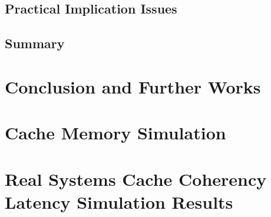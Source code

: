 \documentclass[medieteknikk]{gucmasterthesis}
\begin{document}
	\section{Practical Implication Issues}
	\section{Summary}
\chapter{Conclusion and Further Works}






\appendix

\chapter{Cache Memory Simulation}
\chapter{Real Systems Cache Coherency Latency Simulation Results}
\end{document}
